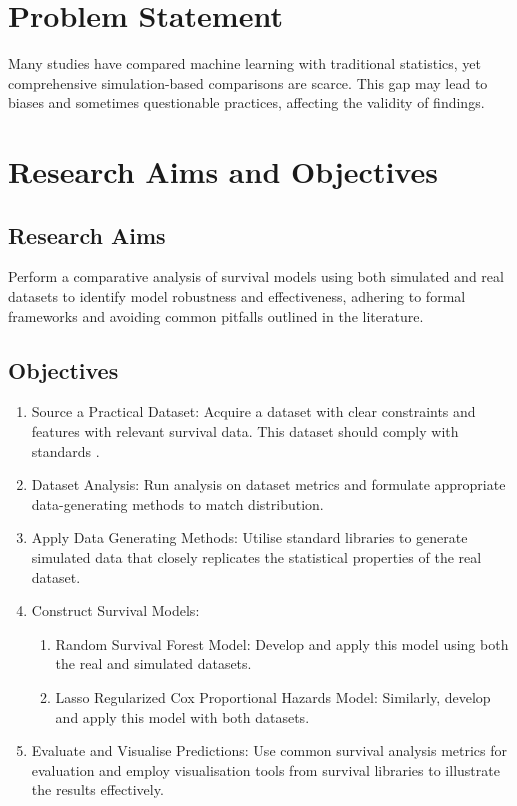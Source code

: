 \section{Problem Statement}
\noindent Many studies have compared machine learning with traditional statistics, yet comprehensive simulation-based comparisons are scarce. This gap may lead to biases and sometimes questionable practices, affecting the validity of findings.

\section{Research Aims and Objectives}
\subsection{Research Aims}
\noindent Perform a comparative analysis of survival models using both simulated and real datasets to identify model robustness and effectiveness, adhering to formal frameworks and avoiding common pitfalls outlined in the literature.
\subsection{Objectives}
\begin{enumerate}
	\item Source a Practical Dataset: Acquire a dataset with clear constraints and features with relevant survival data. This dataset should comply with standards \parencite{wilkinson_fair_2016}. 
	\item Dataset Analysis: Run analysis on dataset metrics and formulate appropriate data-generating methods to match distribution.
	\item Apply Data Generating Methods: Utilise standard libraries to generate simulated data that closely replicates the statistical properties of the real dataset.
	\item Construct Survival Models:
	\begin{enumerate}
		\item Random Survival Forest Model: Develop and apply this model using both the real and simulated datasets.
		\item Lasso Regularized Cox Proportional Hazards Model: Similarly, develop and apply this model with both datasets.
	\end{enumerate}
	\item Evaluate and Visualise Predictions: Use common survival analysis metrics for evaluation and employ visualisation tools from survival libraries to illustrate the results effectively.
\end{enumerate}
 
